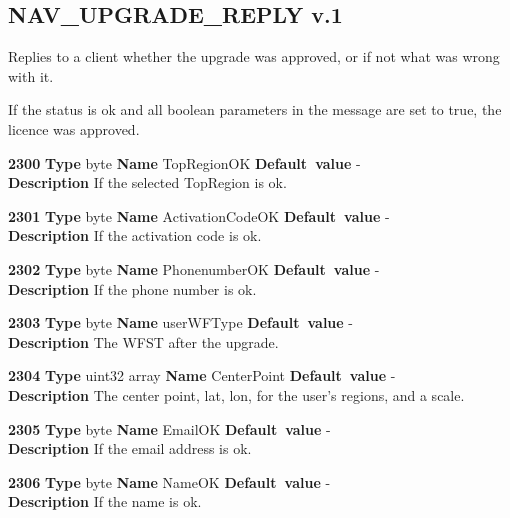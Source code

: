 \documentclass[a4paper]{article}
\begin{document}
\subsection{NAV\_UPGRADE\_REPLY v.1}

Replies to a client whether the upgrade was approved, or if not what
was wrong with it.

If the status is ok and all boolean parameters in the message are set to 
true, the licence was approved.



\begin{list}{\textbf{ParamID}}{}
\item \textbf{2300} \textbf{Type} byte \textbf{Name} TopRegionOK
                 \textbf{Default~value} - \\
  \label{TopRegionOK}
  \textbf{Description} If the selected TopRegion is ok.
\item \textbf{2301} \textbf{Type} byte \textbf{Name} ActivationCodeOK
                 \textbf{Default~value} - \\
  \label{ActivationCodeOK}
  \textbf{Description} If the activation code is ok.
\item \textbf{2302} \textbf{Type} byte \textbf{Name} PhonenumberOK
                 \textbf{Default~value} - \\
  \label{phonenumberOK}
  \textbf{Description} If the phone number is ok.
\item \textbf{2303} \textbf{Type} byte \textbf{Name} userWFType
                 \textbf{Default~value} - \\
  \label{userWFType}
  \textbf{Description} The WFST after the upgrade.
\item \textbf{2304} \textbf{Type} uint32 array \textbf{Name} CenterPoint
                 \textbf{Default~value} - \\
  \label{CenterPoint}
  \textbf{Description} The center point, lat, lon, for the user's regions, 
    and a scale.
\item \textbf{2305} \textbf{Type} byte \textbf{Name} EmailOK
                 \textbf{Default~value} - \\
  \label{EmailOK}
  \textbf{Description} If the email address is ok.
\item \textbf{2306} \textbf{Type} byte \textbf{Name} NameOK
                 \textbf{Default~value} - \\
  \label{NameOK}
  \textbf{Description} If the name is ok.
\end{list}
\end{document}
